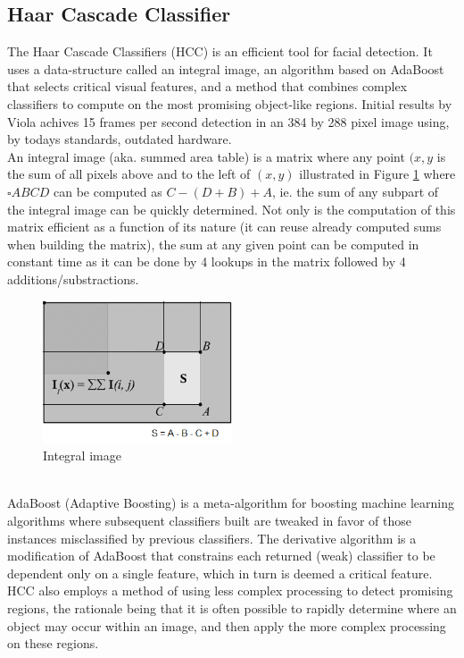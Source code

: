 \subsection{Haar Cascade Classifier}\label{sec:hcc}
%
The Haar Cascade Classifiers (HCC)\cite{viola01,lienhart01,schmidt01,schmidt02} is an efficient tool for facial detection. It uses a data-structure called an integral image, an algorithm based on AdaBoost that selects critical visual features, and a method that combines complex classifiers to compute on the most promising object-like regions. Initial results by Viola\cite{viola01} achives 15 frames per second detection in an 384 by 288 pixel image using, by todays standards, outdated hardware.\\
%
An integral image (aka. summed area table) is a matrix where any point $(x,y$ is the sum of all pixels above and to the left of $(x,y)$ illustrated in Figure \ref{fig:integral_img} where $\square ABCD$ can be computed as $C-(D+B)+A$, ie. the sum of any subpart of the integral image can be quickly determined. Not only is the computation of this matrix efficient as a function of its nature (it can reuse already computed sums when building the matrix), the sum at any given point can be computed in constant time as it can be done by 4 lookups in the matrix followed by 4 additions/substractions.
%
\begin{figure}[!ht]
     \centering
     \includegraphics[width=0.50\textwidth]{img/integral_image.png}
     \caption{Integral image}\label{fig:integral_img}
\end{figure}\\
%
AdaBoost (Adaptive Boosting) is a meta-algorithm for boosting machine learning algorithms where subsequent classifiers built are tweaked in favor of those instances misclassified by previous classifiers. The derivative algorithm is a modification of AdaBoost that constrains each returned (weak) classifier to be dependent only on a single feature, which in turn is deemed a critical feature.\\
HCC also employs a method of using less complex processing to detect promising regions, the rationale being that it is often possible to rapidly determine where an object may occur within an image, and then apply the more complex processing on these regions.
%
